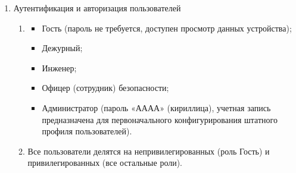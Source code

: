 \begin{enumerate}[label=\arabic{section}.\arabic{subsection}.\arabic*, labelsep=4pt, leftmargin=0pt, itemindent=57pt]
\begin{enumerate}[label=\arabic{section}.\arabic{subsection}.\arabic{enumi}.\arabic*, labelsep=4pt, leftmargin=0em, itemindent=65pt, parsep=0pt]
\item
В случае появления критической неисправности активируется внутренний сигнал «Критическая неисправность», производится запись в журнал событий, замыкаются контакты реле IRF, прекращается работа алгоритмов основных функций в составе устройства, это состояние устройства сигнализируется свечением светодиода «Неисправность» и отсутствием свечения светодиода «Готовность».
Для выхода из режима критической неисправности требуется перезапуск устройства.

\item
В случае появления некритической ошибки активируется внутренний сигнал «Некритическая ошибка», производится запись в журнал событий, алгоритмы основных функций в составе устройства продолжают выполняться, это состояние устройства сигнализируется свечением светодиода «Неисправность» и отсутствием свечения светодиода «Готовность».
Устройство может выйти из режима предупредительной сигнализации без активных действий со стороны пользователя по факту пропадания критериев режима.

\end{enumerate}

\item Аутентификация и авторизация пользователей
\begin{enumerate}[label=\arabic{section}.\arabic{subsection}.\arabic{enumi}.\arabic*, labelsep=4pt, leftmargin=0em, itemindent=65pt, parsep=0pt]

\item 
{}
\begin{itemize}
\item Гость (пароль не требуется, доступен просмотр данных устройства);
\item Дежурный;
\item Инженер;
\item Офицер (сотрудник) безопасности;
\item Администратор (пароль «АААА» (кириллица), учетная запись предназначена для первоначального конфигурирования штатного профиля пользователей).
\end{itemize}

\item 
Все пользователи делятся на непривилегированных (роль Гость) и привилегированных (все остальные роли).


\end{enumerate}
\end{enumerate}
